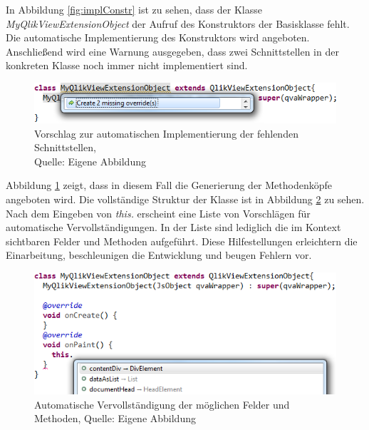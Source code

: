 \begin{appendix}
In Abbildung \ref{fig:implConstr} ist zu sehen, dass der Klasse \textit{MyQlikViewExtensionObject} der Aufruf des Konstruktors der Basisklasse fehlt. Die automatische Implementierung des Konstruktors wird angeboten. Anschließend wird eine Warnung ausgegeben, dass zwei Schnittstellen in der konkreten Klasse noch immer nicht implementiert sind.

\ifIncludeFigures\begin{figure}[htbp]
	\centering
		\includegraphics[width=1.00\textwidth]{img/HilfeDurchEditor/implOverride.png}
	\caption[Vorschlag zur automatischen Implementierung der fehlenden Schnittstellen]{Vorschlag zur automatischen Implementierung der fehlenden Schnittstellen, \\Quelle: Eigene Abbildung}
	\label{fig:implOverride}
\end{figure}\fi

Abbildung \ref{fig:implOverride} zeigt, dass in diesem Fall die Generierung der Methodenköpfe angeboten wird. Die vollständige Struktur der Klasse ist in Abbildung \ref{fig:complete} zu sehen. Nach dem Eingeben von \textit{this.} erscheint eine Liste von Vorschlägen für automatische Vervollständigungen. In der Liste sind lediglich die im Kontext sichtbaren Felder und Methoden aufgeführt. Diese Hilfestellungen erleichtern die Einarbeitung, beschleunigen die Entwicklung und beugen Fehlern vor.

\ifIncludeFigures\begin{figure}[htbp]
	\centering
		\includegraphics[width=1.00\textwidth]{img/HilfeDurchEditor/complete.png}
	\caption[Automatische Vervollständigung der möglichen Felder und Methoden]{Automatische Vervollständigung der möglichen Felder und Methoden, Quelle: Eigene Abbildung}
	\label{fig:complete}
\end{figure}\fi



\end{appendix} 
